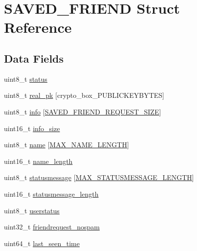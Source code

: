 \hypertarget{struct_s_a_v_e_d___f_r_i_e_n_d}{\section{S\+A\+V\+E\+D\+\_\+\+F\+R\+I\+E\+N\+D Struct Reference}
\label{struct_s_a_v_e_d___f_r_i_e_n_d}
}
\subsection*{Data Fields}
\begin{DoxyCompactItemize}
\item 
uint8\+\_\+t \hyperlink{struct_s_a_v_e_d___f_r_i_e_n_d_ade818037fd6c985038ff29656089758d}{status}
\item 
uint8\+\_\+t \hyperlink{struct_s_a_v_e_d___f_r_i_e_n_d_ab42b4c90d81ac99b968c3edd1e21d706}{real\+\_\+pk} \mbox{[}crypto\+\_\+box\+\_\+\+P\+U\+B\+L\+I\+C\+K\+E\+Y\+B\+Y\+T\+E\+S\mbox{]}
\item 
uint8\+\_\+t \hyperlink{struct_s_a_v_e_d___f_r_i_e_n_d_a30d0b669f0c53df867104ef9fc4ca5ac}{info} \mbox{[}\hyperlink{_messenger_8c_a5546558d2255f81d24707b447cb5bb94}{S\+A\+V\+E\+D\+\_\+\+F\+R\+I\+E\+N\+D\+\_\+\+R\+E\+Q\+U\+E\+S\+T\+\_\+\+S\+I\+Z\+E}\mbox{]}
\item 
uint16\+\_\+t \hyperlink{struct_s_a_v_e_d___f_r_i_e_n_d_ac0ae002db55ef8f8366de10ec005b65a}{info\+\_\+size}
\item 
uint8\+\_\+t \hyperlink{struct_s_a_v_e_d___f_r_i_e_n_d_a11b8cc6595eea79e65c978209278e683}{name} \mbox{[}\hyperlink{_messenger_8h_a0c397a708cec89c74029582574516b30}{M\+A\+X\+\_\+\+N\+A\+M\+E\+\_\+\+L\+E\+N\+G\+T\+H}\mbox{]}
\item 
uint16\+\_\+t \hyperlink{struct_s_a_v_e_d___f_r_i_e_n_d_a3573d7a906b26e9999cd74f2c4066601}{name\+\_\+length}
\item 
uint8\+\_\+t \hyperlink{struct_s_a_v_e_d___f_r_i_e_n_d_a8f12612ac1191135a1a5b1cbcbc82852}{statusmessage} \mbox{[}\hyperlink{_messenger_8h_a0d1a4b91dd43b4cb07dfefab7fc6bee1}{M\+A\+X\+\_\+\+S\+T\+A\+T\+U\+S\+M\+E\+S\+S\+A\+G\+E\+\_\+\+L\+E\+N\+G\+T\+H}\mbox{]}
\item 
uint16\+\_\+t \hyperlink{struct_s_a_v_e_d___f_r_i_e_n_d_a43fe9dde52dc12e90933150eca91c0c3}{statusmessage\+\_\+length}
\item 
uint8\+\_\+t \hyperlink{struct_s_a_v_e_d___f_r_i_e_n_d_a6985227ceff68d0298d6ee9e09316945}{userstatus}
\item 
uint32\+\_\+t \hyperlink{struct_s_a_v_e_d___f_r_i_e_n_d_a0fae9801a4789a368f90125119e31f3f}{friendrequest\+\_\+nospam}
\item 
uint64\+\_\+t \hyperlink{struct_s_a_v_e_d___f_r_i_e_n_d_a8f99c48eb6b3ea472806495135ab6792}{last\+\_\+seen\+\_\+time}
\end{DoxyCompactItemize}


